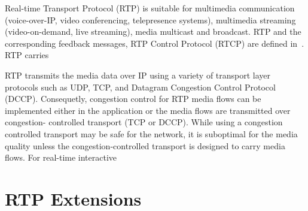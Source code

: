 
Real-time Transport Protocol (RTP) is suitable for multimedia communication
(voice-over-IP, video conferencing, telepresence systems), multimedia
streaming (video-on-demand, live streaming), media multicast and broadcast.
RTP and the corresponding feedback messages, RTP Control Protocol (RTCP) are
defined in~\cite{rfc3550}. RTP carries 



RTP transmits the media data over IP using a variety of transport layer
protocols such as UDP, TCP, and Datagram Congestion Control Protocol (DCCP).
Consequetly, congestion control for RTP media flows can be implemented either
in the application or the media flows are transmitted over congestion-
controlled transport (TCP or DCCP). While using a congestion controlled
transport may be safe for the network, it is suboptimal for the media quality
unless the congestion-controlled transport is designed to carry media flows.
For real-time interactive




\section{RTP Extensions}
\label{rtp.ext}
